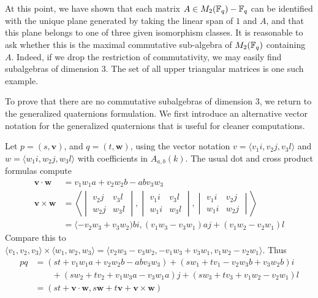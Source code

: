 \documentclass{amsart}
\begin{document}
At this point, we have shown that each matrix $A \in M_2(\protect\mathbb{F}_q) - \protect\mathbb{F}_q$ can be identified with the unique plane generated by taking the linear span of $1$ and $A$, and that this plane belongs to one of three given isomorphism classes.
It is reasonable to ask whether this is the maximal commutative sub-algebra of $M_2(\protect\mathbb{F}_q)$ containing $A$. Indeed, if we drop the restriction of commutativity, we may easily find subalgebras of dimension 3.
The set of all upper triangular matrices is one such example.

To prove that there are no commutative subalgebras of dimension 3, we return to the generalized quaternions formulation. We first introduce an alternative vector notation for the generalized quaternions that is useful for cleaner computations.

\begin{defn}
    Let $p = (s, \mathbf{v})$, and $q = (t, \mathbf{w})$, using the vector notation $v = \langle v_1i, v_2j, v_3l \rangle$ and $w = \langle w_1i, w_2j, w_3l \rangle$ with coefficients in $A_{a,b}(k)$. The usual dot and cross product formulas compute
    \begin{align*}
        \mathbf{v} \cdot  \mathbf{w} &= v_1w_1a + v_2w_2b -abv_3w_3 \\
        \mathbf{v} \times \mathbf{w} &=
            \left\langle\begin{vmatrix}
                v_2j & v_3l \\
                w_2j & w_3l
            \end{vmatrix},
            \begin{vmatrix}
                v_1i & v_3l \\
                w_1i & w_3l
            \end{vmatrix},
            \begin{vmatrix}
                v_1i & v_2j \\
                w_1i & w_2j
            \end{vmatrix}\right\rangle \\
                                    &= \langle -v_2w_3 + v_3w_2)bi , (v_1w_3 - v_3w_1)aj + (v_1w_2 - v_2w_1)l
    \end{align*}
    Compare this to $\langle v_1, v_2, v_3 \rangle \times \langle w_1, w_2, w_3 \rangle = \langle v_2w_3 - v_3w_2, -v_1w_3 + v_3w_1, v_1w_2 - v_2w_1 \rangle$. Thus 
    \begin{align*}
        pq &= (st + v_1w_1a + v_2w_2b -abv_3w_3) + (sw_1 + tv_1 - v_2w_3b + v_3w_2b)i \\
           &\qquad + (sw_2 + tv_2 + v_1w_3a-v_3w_1a)j + (sw_3 + tv_3 + v_1w_2 - v_2w_1)l \\
           &= (st + \mathbf{v} \cdot \mathbf{w}, s\mathbf{w} + t\mathbf{v} + \mathbf{v} \times \mathbf{w})
    \end{align*}
\end{defn}
\end{document}
